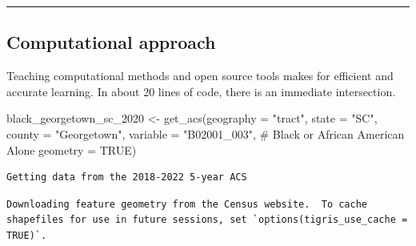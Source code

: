 \documentclass[
  letterpaper,
  DIV=11,
  numbers=noendperiod]{scrartcl}
\newenvironment{Shaded}{\begin{snugshade}}{\end{snugshade}}
\newcommand{\AttributeTok}[1]{\textcolor[rgb]{0.40,0.45,0.13}{#1}}
\newcommand{\CommentTok}[1]{\textcolor[rgb]{0.37,0.37,0.37}{#1}}
\newcommand{\ConstantTok}[1]{\textcolor[rgb]{0.56,0.35,0.01}{#1}}
\newcommand{\FunctionTok}[1]{\textcolor[rgb]{0.28,0.35,0.67}{#1}}
\newcommand{\NormalTok}[1]{\textcolor[rgb]{0.00,0.23,0.31}{#1}}
\newcommand{\OtherTok}[1]{\textcolor[rgb]{0.00,0.23,0.31}{#1}}
\newcommand{\StringTok}[1]{\textcolor[rgb]{0.13,0.47,0.30}{#1}}
\begin{document}
\begin{center}\rule{0.5\linewidth}{0.5pt}\end{center}

\hypertarget{computational-approach}{%
\subsection{Computational approach}\label{computational-approach}}

Teaching computational methods and open source tools makes for efficient
and accurate learning. In about 20 lines of code, there is an immediate
intersection.

\begin{Shaded}
\begin{Highlighting}[]
\NormalTok{black\_georgetown\_sc\_2020 }\OtherTok{\textless{}{-}}
  \FunctionTok{get\_acs}\NormalTok{(}\AttributeTok{geography =} \StringTok{"tract"}\NormalTok{, }\AttributeTok{state =} \StringTok{"SC"}\NormalTok{,}
          \AttributeTok{county =} \StringTok{"Georgetown"}\NormalTok{,}
                        \AttributeTok{variable =} \StringTok{"B02001\_003"}\NormalTok{, }\CommentTok{\# Black or African American Alone}
                        \AttributeTok{geometry =} \ConstantTok{TRUE}\NormalTok{)}
\end{Highlighting}
\end{Shaded}

\begin{verbatim}
Getting data from the 2018-2022 5-year ACS
\end{verbatim}

\begin{verbatim}
Downloading feature geometry from the Census website.  To cache shapefiles for use in future sessions, set `options(tigris_use_cache = TRUE)`.
\end{verbatim}
\end{document}
